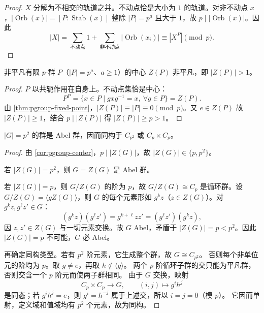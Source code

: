 \begin{proof}
$X$ 分解为不相交的轨道之并。不动点恰是大小为 $1$ 的轨道。对非不动点 $x$，$|\operatorname{Orb}(x)|=[P:\operatorname{Stab}(x)]$ 整除 $|P|=p^a$ 且大于 $1$，故 $p\mid|\operatorname{Orb}(x)|$。因此
\[
|X|=\sum_{\text{不动点}}1+\sum_{\text{非不动点}}|\operatorname{Orb}(x_i)|\equiv|X^P|\pmod{p}.
\]
\end{proof}

\begin{corollary}[$p$-群有非平凡中心]
\label{cor:pgroup-center}
非平凡有限 $p$-群 $P$（$|P|=p^a$、$a\ge1$）的中心 $Z(P)$ 非平凡，即 $|Z(P)|>1$。

\end{corollary}

\begin{proof}
$P$ 以共轭作用在自身上。不动点集恰是中心：
\[
P^P=\{x\in P\mid gxg^{-1}=x,\ \forall g\in P\}=Z(P).
\]
由 \cref{thm:pgroup-fixed-point}，$|Z(P)|\equiv|P|\equiv0\pmod{p}$。又 $e\in Z(P)$ 故 $|Z(P)|\ge1$，结合 $p\mid|Z(P)|$ 得 $|Z(P)|\ge p>1$。
\end{proof}

\begin{corollary}
\label{cor:p2-abelian}
$|G|=p^2$ 的群是 Abel 群，因而同构于 $C_{p^2}$ 或 $C_p\times C_p$。

\end{corollary}

\begin{proof}
由 \cref{cor:pgroup-center}，$p\mid|Z(G)|$，故 $|Z(G)|\in\{p,p^2\}$。

若 $|Z(G)|=p^2$，则 $G=Z(G)$ 是 Abel 群。

若 $|Z(G)|=p$，则 $G/Z(G)$ 的阶为 $p$，故 $G/Z(G)\cong C_p$ 是循环群。设 $G/Z(G)=\langle gZ(G)\rangle$，则 $G$ 的每个元素形如 $g^k z$（$z\in Z(G)$）。对 $g^k z, g^\ell z'\in G$：
\[
(g^k z)(g^\ell z')=g^{k+\ell}zz'=(g^\ell z')(g^k z),
\]
因 $z,z'\in Z(G)$ 与一切元素交换。故 $G$ Abel，矛盾于 $|Z(G)|=p<p^2$。因此 $|Z(G)|=p$ 不可能，$G$ 必 Abel。

再确定同构类型。若有 $p^2$ 阶元素，它生成整个群，故 $G\cong C_{p^2}$。
否则每个非单位元的阶均为 $p$。取 $g\ne e$，再取 $h\notin\langle g\rangle$。
两个 $p$ 阶循环子群的交只能为平凡群，否则交含一个 $p$ 阶元而使两子群相同。
由于 $G$ 交换，映射
\[
C_p\times C_p\longrightarrow G,\qquad (i,j)\longmapsto g^ih^j
\]
是同态；若 $g^ih^j=e$，则 $g^i=h^{-j}$ 属于上述交，所以 $i=j=0$（模 $p$）。
它因而单射，定义域和值域均有 $p^2$ 个元素，故为同构。
\end{proof}

